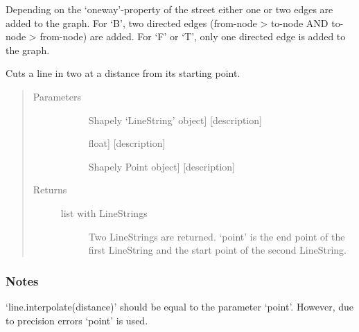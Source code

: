 \documentclass[letterpaper,10pt,english]{sphinxmanual}
\begin{document}
\begin{fulllineitems}
\begin{itemize}
\begin{description}
\end{description}

\end{itemize}

Depending on the ‘oneway’-property of the street either one or two edges are added to the graph. For ‘B’, two directed edges (from-node \textendash{}\textgreater{} to-node AND to-node \textendash{}\textgreater{} from-node) are added. For ‘F’ or ‘T’, only one directed edge is added to the graph.

\end{fulllineitems}


\begin{fulllineitems}
\label{\detokenize{index:gps2net.cut}}
Cuts a line in two at a distance from its starting point.
\begin{quote}\begin{description}
\item[{Parameters}] \leavevmode\begin{description}
\item[{}] \leavevmode{[}Shapely ‘LineString’ object{]}
{[}description{]}

\item[{}] \leavevmode{[}float{]}
{[}description{]}

\item[{}] \leavevmode{[}Shapely Point object{]}
{[}description{]}

\end{description}

\item[{Returns}] \leavevmode\begin{description}
\item[{list with LineStrings}] \leavevmode
Two LineStrings are returned. ‘point’ is the end point of the first LineString and the start point of the second LineString.

\end{description}

\end{description}\end{quote}
\subsubsection*{Notes}

‘line.interpolate(distance)’ should be equal to the parameter ‘point’. However, due to precision errors ‘point’ is used.

\end{fulllineitems}
\end{document}
